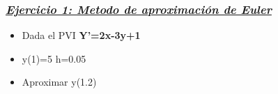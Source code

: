 \documentclass[12 pt,letterpaper]{article}
\begin{document}
	\flushleft\subsubsection{\underline{\textit{Ejercicio 1: Metodo de aproximación de Euler}}}\vspace{0.5cm}
	
	\begin{itemize}
		\item Dada el PVI\hspace{1cm} \textbf{Y’=2x-3y+1}
		\item y(1)=5 \hspace{2cm} h=0.05
		\item Aproximar y(1.2)
	\end{itemize}\leavevmode\newline
	
\end{document}
